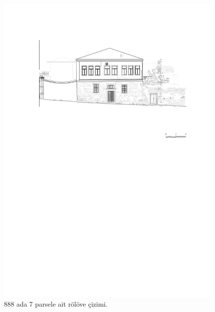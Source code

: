 \begin{figure}
\centering
\includegraphics[width=1\textwidth,height=\textheight]{source/figures/Roloveler/R888-7.pdf}
\caption{888 ada 7 parsele ait rölöve çizimi.}
\end{figure}

